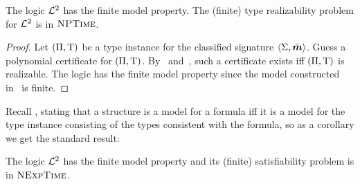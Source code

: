 \begin{proposition}
The logic $\mathcal{L}^{2}$ has the finite model property. The (finite) type realizability
problem for $\mathcal{L}^{2}$ is in $\text{\normalfont{\scshape NPTime}}$.
\end{proposition}
\begin{proof}
Let $(\Pi,\mathrm{T})$ be a type instance for the classified signature
$\left\langle \mathrm{\Sigma},\bar{\bm{m}} \right\rangle$. Guess a polynomial certificate for $(\Pi,\mathrm{T})$.
By~ and~, such a certificate exists
iff $(\Pi,\mathrm{T})$ is realizable.
The logic has the finite model property since the model constructed
in~ is finite.
\end{proof}
Recall , stating that a structure is a model for a
formula iff it is a model for the type instance consisting of the types
consistent with the formula, so as a corollary we get the standard result:
\begin{corollary}
The logic $\mathcal{L}^{2}$ has the finite model property and its (finite) satisfiability
problem is in $\text{\normalfont{\scshape NExpTime}}$.
\end{corollary}